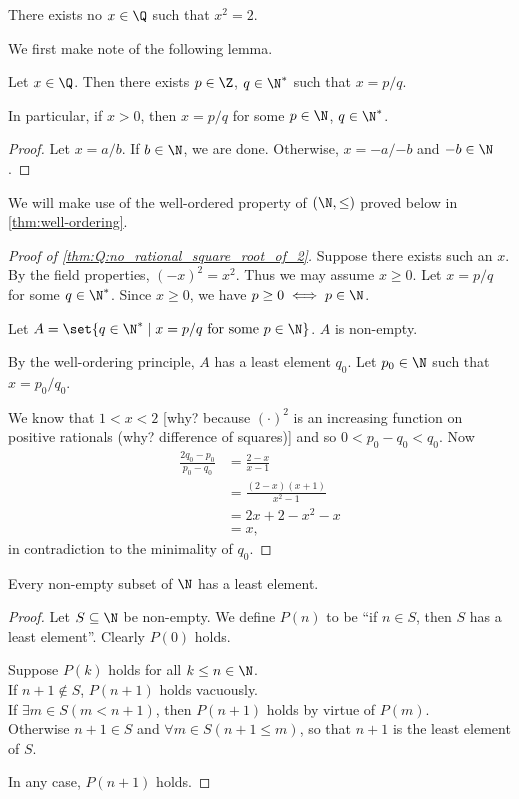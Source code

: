 \begin{theorem} \label{thm:Q:no_rational_square_root_of_2}
    There exists no $x \in \Q$ such that $x^2 = 2$.
\end{theorem}
We first make note of the following lemma.
\begin{lemma} \label{thm:positive_denominator}
    Let $x \in \Q$.
    Then there exists $p \in \Z$, $q \in \N^*$ such that $x = p/q$.

    In particular, if $x > 0$, then $x = p/q$ for some $p \in \N$, $q \in \N^*$.
\end{lemma}
\begin{proof}
    Let $x = a/b$.
    If $b \in \N$, we are done.
    Otherwise, $x = -a/{-b}$ and $-b \in \N$. %
\end{proof}
We will make use of the well-ordered property of $(\N, \le)$ proved below in
\cref{thm:well-ordering}.
\begin{proof}[Proof of \cref{thm:Q:no_rational_square_root_of_2}]
    Suppose there exists such an $x$.
    By the field properties, $(-x)^2 = x^2$.
    Thus we may assume $x \ge 0$.
    Let $x = p/q$ for some $q \in \N^*$.
    Since $x \ge 0$, we have $p \ge 0 \iff p \in \N$.

    Let $A = \set{q \in \N^* \mid x = p/q \text{ for some } p \in \N}$.
    $A$ is non-empty.

    By the well-ordering principle, $A$ has a least element $q_0$.
    Let $p_0 \in \N$ such that $x = p_0/q_0$.

    We know that $1 < x < 2$ [why? because $(\cdot)^2$ is an increasing function
    on positive rationals (why? difference of squares)] and so $0 < p_0-q_0 < q_0$.
    Now \begin{align*}
        \frac{2q_0 - p_0}{p_0 - q_0}
            &= \frac{2 - x}{x - 1} \\
            &= \frac{(2 - x)(x + 1)}{x^2 - 1} \\
            &= 2x + 2 - x^2 - x \\
            &= x,
    \end{align*}
    in contradiction to the minimality of $q_0$.
\end{proof}

\begin{theorem} \label{thm:well-ordering}
    Every non-empty subset of $\N$ has a least element.
\end{theorem}
\begin{proof}
    Let $S \subseteq \N$ be non-empty.
    We define $P(n)$ to be ``if $n \in S$, then $S$ has a least element''.
    Clearly $P(0)$ holds.

    Suppose $P(k)$ holds for all $k \le n \in \N$. \\
    If $n+1 \notin S$, $P(n+1)$ holds vacuously. \\
    If $\exists m \in S (m < n+1)$, then $P(n+1)$ holds by virtue of $P(m)$. \\
    Otherwise $n+1 \in S$ and $\forall m \in S (n+1 \le m)$, so that $n+1$ is
    the least element of $S$.

    In any case, $P(n+1)$ holds.
\end{proof}

